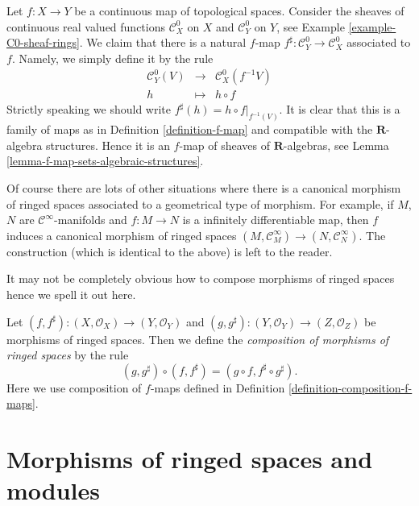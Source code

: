 \begin{example}
\label{example-continuous-map-ringed}
Let $f : X \to Y$ be a continuous map of topological spaces.
Consider the sheaves of continuous real valued functions
$\mathcal{C}^0_X$ on $X$ and $\mathcal{C}^0_Y$ on $Y$,
see Example \ref{example-C0-sheaf-rings}. We claim that there
is a natural $f$-map $f^\sharp : \mathcal{C}^0_Y \to \mathcal{C}^0_X$
associated to $f$. Namely, we simply define it by the
rule
\begin{eqnarray*}
\mathcal{C}^0_Y(V) & \longrightarrow & \mathcal{C}^0_X(f^{-1}V) \\
h & \longmapsto & h \circ f
\end{eqnarray*}
Strictly speaking we should write $f^\sharp(h) = h \circ f|_{f^{-1}(V)}$.
It is clear that this is a family of maps as in
Definition \ref{definition-f-map} and compatible with the $\mathbf{R}$-algebra
structures. Hence it is an $f$-map of sheaves of $\mathbf{R}$-algebras, see
Lemma \ref{lemma-f-map-sets-algebraic-structures}.

\medskip\noindent
Of course there are lots of other situations where there is
a canonical morphism of ringed spaces associated to a geometrical
type of morphism. For example, if $M$, $N$ are $\mathcal{C}^\infty$-manifolds
and $f : M \to N$ is a infinitely differentiable map, then
$f$ induces a canonical morphism of ringed spaces
$(M, \mathcal{C}_M^\infty) \to (N, \mathcal{C}^\infty_N)$.
The construction (which is identical to the above) is left
to the reader.
\end{example}

\noindent
It may not be completely obvious how to compose morphisms of
ringed spaces hence we spell it out here.

\begin{definition}
\label{definition-composition-maps-ringed-spaces}
Let
$(f, f^\sharp) : (X, \mathcal{O}_X) \to (Y, \mathcal{O}_Y)$ and
$(g, g^\sharp) : (Y, \mathcal{O}_Y) \to (Z, \mathcal{O}_Z)$
be morphisms of ringed spaces. Then we define
the {\it composition of morphisms of ringed spaces}
by the rule
$$
(g, g^\sharp) \circ (f, f^\sharp) = (g \circ f, f^\sharp \circ g^\sharp).
$$
Here we use composition of $f$-maps defined in
Definition \ref{definition-composition-f-maps}.
\end{definition}


\section{Morphisms of ringed spaces and modules}
\label{section-ringed-spaces-functoriality-modules}

